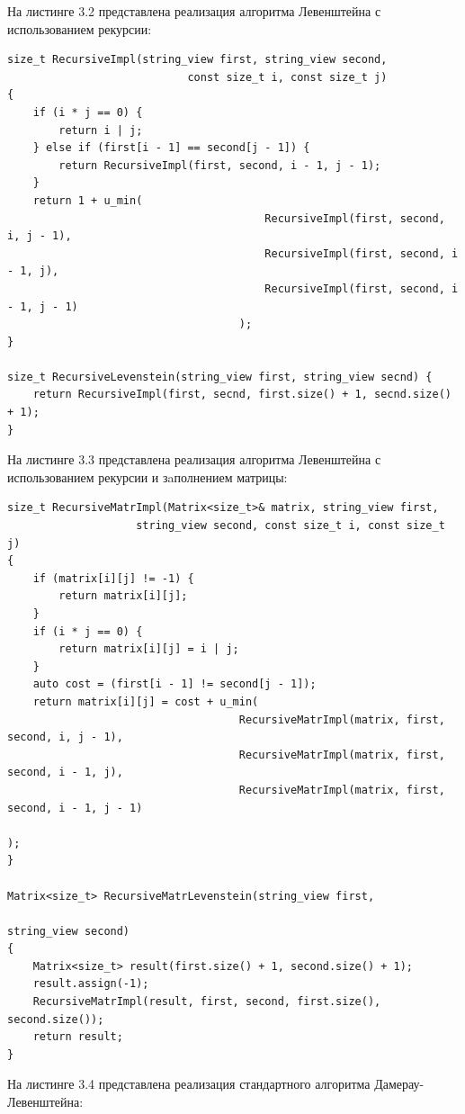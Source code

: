 \documentclass[12pt,a4paper,oneside]{report}
\begin{document}
\qquad На листинге 3.2 представлена реализация алгоритма Левенштейна с использованием рекурсии:

\begin{lstlisting}[label=rec_leven,caption=Функция нахождения расстояния Левенштейна с использованием рекурсии]
size_t RecursiveImpl(string_view first, string_view second,
							const size_t i, const size_t j) 
{
	if (i * j == 0) {
		return i | j;
	} else if (first[i - 1] == second[j - 1]) {
		return RecursiveImpl(first, second, i - 1, j - 1);
	}
	return 1 + u_min(
										RecursiveImpl(first, second, i, j - 1),
										RecursiveImpl(first, second, i - 1, j),
										RecursiveImpl(first, second, i - 1, j - 1)
									);
}

size_t RecursiveLevenstein(string_view first, string_view secnd) {
	return RecursiveImpl(first, secnd, first.size() + 1, secnd.size() + 1);
}
\end{lstlisting}

\newpage
\qquad На листинге 3.3 представлена реализация алгоритма Левенштейна с использованием рекурсии и зaполнением матрицы:

\begin{lstlisting}[label=matrx_rec_leven,caption=Функция нахождения расстояния Левенштейна с использованием рекурсии и заполнением матрицы]
size_t RecursiveMatrImpl(Matrix<size_t>& matrix, string_view first,
					string_view second, const size_t i, const size_t j)
{
	if (matrix[i][j] != -1) {
		return matrix[i][j];
	}
	if (i * j == 0) {
		return matrix[i][j] = i | j;
	}
	auto cost = (first[i - 1] != second[j - 1]);
	return matrix[i][j] = cost + u_min(
									RecursiveMatrImpl(matrix, first, second, i, j - 1),
									RecursiveMatrImpl(matrix, first, second, i - 1, j),
									RecursiveMatrImpl(matrix, first, second, i - 1, j - 1)
																	   );
}

Matrix<size_t> RecursiveMatrLevenstein(string_view first, 
																		 	 string_view second) 
{
	Matrix<size_t> result(first.size() + 1, second.size() + 1);
	result.assign(-1);
	RecursiveMatrImpl(result, first, second, first.size(), second.size());
	return result;
}

\end{lstlisting}

\newpage

\qquad На листинге 3.4 представлена реализация стандартного алгоритма Дамерау-Левенштейна:
\end{document}
